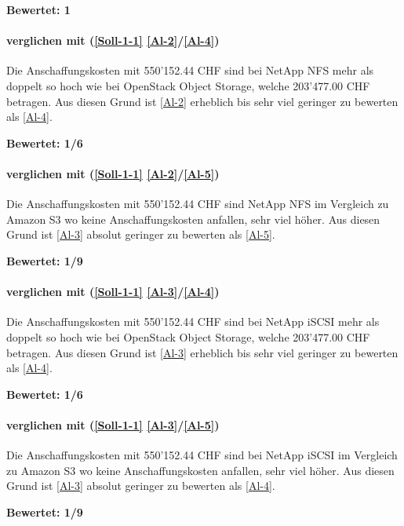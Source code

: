 \textbf{Bewertet: 1}

\paragraph*{  verglichen mit  (\ref{Soll-1-1} \ref{Al-2}/\ref{Al-4})}
Die Anschaffungskosten mit 550'152.44 CHF sind bei NetApp NFS mehr als doppelt so hoch wie bei OpenStack Object Storage, welche 203'477.00 CHF betragen. Aus diesen Grund ist  \ref{Al-2} erheblich bis sehr viel geringer zu bewerten als  \ref{Al-4}.

\textbf{Bewertet: 1/6}

\paragraph*{  verglichen mit  (\ref{Soll-1-1} \ref{Al-2}/\ref{Al-5})}
Die Anschaffungskosten mit 550'152.44 CHF sind NetApp NFS im Vergleich zu Amazon S3 wo keine Anschaffungskosten anfallen, sehr viel höher. Aus diesen Grund ist  \ref{Al-3} absolut geringer zu bewerten als  \ref{Al-5}.

\textbf{Bewertet: 1/9}


\paragraph*{  verglichen mit  (\ref{Soll-1-1} \ref{Al-3}/\ref{Al-4})}
Die Anschaffungskosten mit 550'152.44 CHF sind bei NetApp iSCSI mehr als doppelt so hoch wie bei OpenStack Object Storage, welche 203'477.00 CHF betragen. Aus diesen Grund ist  \ref{Al-3} erheblich bis sehr viel geringer zu bewerten als  \ref{Al-4}.

\textbf{Bewertet: 1/6}

\paragraph*{  verglichen mit  (\ref{Soll-1-1} \ref{Al-3}/\ref{Al-5})}
Die Anschaffungskosten mit 550'152.44 CHF sind bei NetApp iSCSI im Vergleich zu Amazon S3 wo keine Anschaffungskosten anfallen, sehr viel höher. Aus diesen Grund ist  \ref{Al-3} absolut geringer zu bewerten als  \ref{Al-4}.

\textbf{Bewertet: 1/9}


